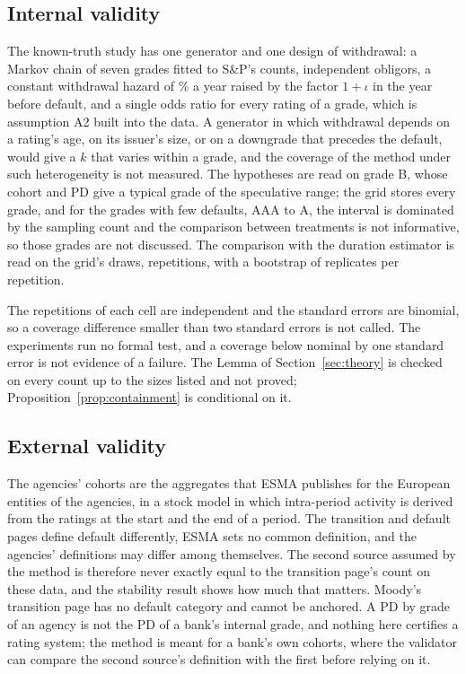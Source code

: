 \subsection{Internal validity}

The known-truth study has one generator and one design of withdrawal: a Markov chain of seven grades fitted to S\&P's counts, independent obligors, a constant withdrawal hazard of \% a year raised by the factor $1+\iota$ in the year before default, and a single odds ratio for every rating of a grade, which is assumption A2 built into the data. A generator in which withdrawal depends on a rating's age, on its issuer's size, or on a downgrade that precedes the default, would give a $k$ that varies within a grade, and the coverage of the method under such heterogeneity is not measured. The hypotheses are read on grade B, whose cohort and PD give a typical grade of the speculative range; the grid stores every grade, and for the grades with few defaults, AAA to A, the interval is dominated by the sampling count and the comparison between treatments is not informative, so those grades are not discussed. The comparison with the duration estimator is read on the grid's draws,  repetitions, with a bootstrap of  replicates per repetition.

The repetitions of each cell are independent and the standard errors are binomial, so a coverage difference smaller than two standard errors is not called. The experiments run no formal test, and a coverage below nominal by one standard error is not evidence of a failure. The Lemma of Section~\ref{sec:theory} is checked on every count up to the sizes listed and not proved; Proposition~\ref{prop:containment} is conditional on it.

\subsection{External validity}

The agencies' cohorts are the aggregates that ESMA publishes for the European entities of the agencies, in a stock model in which intra-period activity is derived from the ratings at the start and the end of a period. The transition and default pages define default differently, ESMA sets no common definition, and the agencies' definitions may differ among themselves. The second source assumed by the method is therefore never exactly equal to the transition page's count on these data, and the stability result shows how much that matters. Moody's transition page has no default category and cannot be anchored. A PD by grade of an agency is not the PD of a bank's internal grade, and nothing here certifies a rating system; the method is meant for a bank's own cohorts, where the validator can compare the second source's definition with the first before relying on it.

